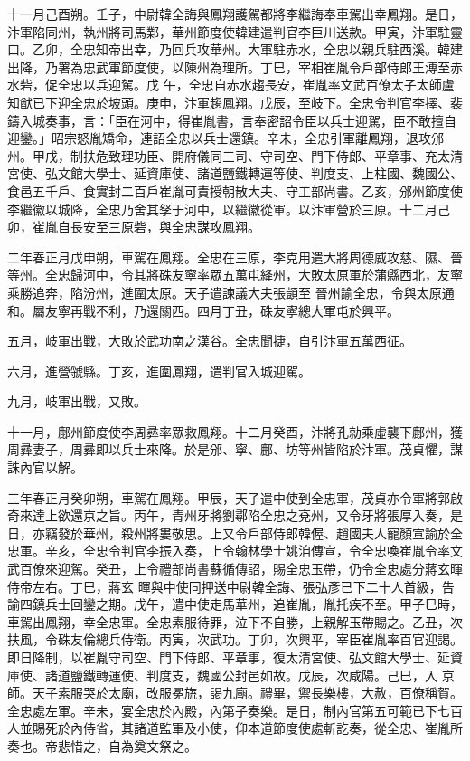 \begin{pinyinscope}
 十一月己酉朔。壬子，中尉韓全誨與鳳翔護駕都將李繼誨奉車駕出幸鳳翔。是日，汴軍陷同州，執州將司馬鄴，華州節度使韓建遣判官李巨川送款。甲寅，汴軍駐靈口。乙卯，全忠知帝出幸，乃回兵攻華州。大軍駐赤水，全忠以親兵駐西溪。韓建出降，乃署為忠武軍節度使，以陳州為理所。丁巳，宰相崔胤令戶部侍郎王溥至赤水砦，促全忠以兵迎駕。戊
 午，全忠自赤水趨長安，崔胤率文武百僚太子太師盧知猷已下迎全忠於坡頭。庚申，汴軍趨鳳翔。戊辰，至岐下。全忠令判官李擇、裴鑄入城奏事，言：「臣在河中，得崔胤書，言奉密詔令臣以兵士迎駕，臣不敢擅自迎鑾。」昭宗怒胤矯命，連詔全忠以兵士還鎮。辛未，全忠引軍離鳳翔，退攻邠州。甲戌，制扶危致理功臣、開府儀同三司、守司空、門下侍郎、平章事、充太清宮使、弘文館大學士、延資庫使、諸道鹽鐵轉運等使、判度支、上柱國、魏國公、
 食邑五千戶、食實封二百戶崔胤可責授朝散大夫、守工部尚書。乙亥，邠州節度使李繼徽以城降，全忠乃舍其孥于河中，以繼徽從軍。以汴軍營於三原。十二月己卯，崔胤自長安至三原砦，與全忠謀攻鳳翔。



 二年春正月戊申朔，車駕在鳳翔。全忠在三原，李克用遣大將周德威攻慈、隰、晉等州。全忠歸河中，令其將硃友寧率眾五萬屯絳州，大敗太原軍於蒲縣西北，友寧乘勝追奔，陷汾州，進圍太原。天子遣諫議大夫張顗至
 晉州諭全忠，令與太原通和。屬友寧再戰不利，乃還關西。四月丁丑，硃友寧總大軍屯於興平。



 五月，岐軍出戰，大敗於武功南之漢谷。全忠聞捷，自引汴軍五萬西征。



 六月，進營虢縣。丁亥，進圍鳳翔，遣判官入城迎駕。



 九月，岐軍出戰，又敗。



 十一月，鄜州節度使李周彞率眾救鳳翔。十二月癸酉，汴將孔勍乘虛襲下鄜州，獲周彞妻子，周彞即以兵士來降。於是邠、寧、鄜、坊等州皆陷於汴軍。茂貞懼，謀誅內官以解。



 三年春正月癸卯朔，車駕在鳳翔。甲辰，天子遣中使到全忠軍，茂貞亦令軍將郭啟奇來達上欲還京之旨。丙午，青州牙將劉鄩陷全忠之兗州，又令牙將張厚入奏，是日，亦竊發於華州，殺州將婁敬思。上又令戶部侍郎韓偓、趙國夫人寵顏宣諭於全忠軍。辛亥，全忠令判官李振入奏，上令翰林學士姚洎傳宣，令全忠喚崔胤令率文武百僚來迎駕。癸丑，上令禮部尚書蘇循傳詔，賜全忠玉帶，仍令全忠處分蔣玄暉侍帝左右。丁巳，蔣玄
 暉與中使同押送中尉韓全誨、張弘彥已下二十人首級，告諭四鎮兵士回鑾之期。戊午，遣中使走馬華州，追崔胤，胤托疾不至。甲子巳時，車駕出鳳翔，幸全忠軍。全忠素服待罪，泣下不自勝，上親解玉帶賜之。乙丑，次扶風，令硃友倫總兵侍衛。丙寅，次武功。丁卯，次興平，宰臣崔胤率百官迎謁。即日降制，以崔胤守司空、門下侍郎、平章事，復太清宮使、弘文館大學士、延資庫使、諸道鹽鐵轉運使、判度支，魏國公封邑如故。戊辰，次咸陽。己巳，入
 京師。天子素服哭於太廟，改服冕旒，謁九廟。禮畢，禦長樂樓，大赦，百僚稱賀。全忠處左軍。辛未，宴全忠於內殿，內第子奏樂。是日，制內官第五可範已下七百人並賜死於內侍省，其諸道監軍及小使，仰本道節度使處斬訖奏，從全忠、崔胤所奏也。帝悲惜之，自為奠文祭之。




\end{pinyinscope}
